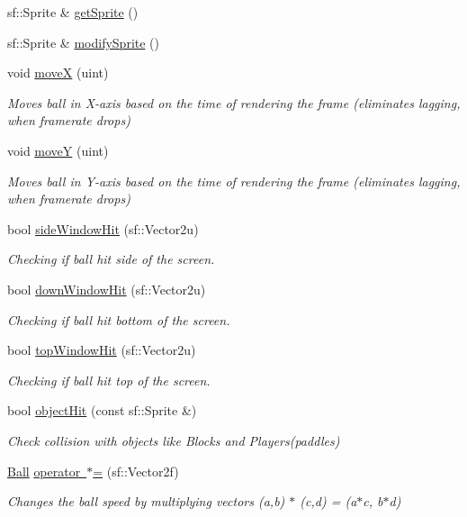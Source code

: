 \begin{DoxyCompactItemize}
sf\+::\+Sprite \& \mbox{\hyperlink{class_ball_a2f85e93bd6650f5c5cbf4a0dbd961ca4}{get\+Sprite}} ()
\item 
sf\+::\+Sprite \& \mbox{\hyperlink{class_ball_a06adff7ba12d0971bb9885cf3fbd2950}{modify\+Sprite}} ()
\item 
void \mbox{\hyperlink{class_ball_ab2a08ec563b02d1dcb0b38dcd5429967}{moveX}} (uint)
\begin{DoxyCompactList}\small\item\em Moves ball in X-\/axis based on the time of rendering the frame (eliminates lagging, when framerate drops) \end{DoxyCompactList}\item 
void \mbox{\hyperlink{class_ball_a5c833ba1588d41ea4176b6fcffff850e}{moveY}} (uint)
\begin{DoxyCompactList}\small\item\em Moves ball in Y-\/axis based on the time of rendering the frame (eliminates lagging, when framerate drops) \end{DoxyCompactList}\item 
bool \mbox{\hyperlink{class_ball_add304c78bcbb5067844d71cb16fc29be}{side\+Window\+Hit}} (sf\+::\+Vector2u)
\begin{DoxyCompactList}\small\item\em Checking if ball hit side of the screen. \end{DoxyCompactList}\item 
bool \mbox{\hyperlink{class_ball_aa1bfb33edb1bdbe67380fe2be419ab11}{down\+Window\+Hit}} (sf\+::\+Vector2u)
\begin{DoxyCompactList}\small\item\em Checking if ball hit bottom of the screen. \end{DoxyCompactList}\item 
bool \mbox{\hyperlink{class_ball_a5e57d9e1b688dc45f6111d7f52b89ccf}{top\+Window\+Hit}} (sf\+::\+Vector2u)
\begin{DoxyCompactList}\small\item\em Checking if ball hit top of the screen. \end{DoxyCompactList}\item 
bool \mbox{\hyperlink{class_ball_a57806d70f8a4f78ba7e66d425465e1e4}{object\+Hit}} (const sf\+::\+Sprite \&)
\begin{DoxyCompactList}\small\item\em Check collision with objects like Blocks and Players(paddles) \end{DoxyCompactList}\item 
\mbox{\hyperlink{class_ball}{Ball}} \mbox{\hyperlink{class_ball_a41fb0c62d108caa6e20573598030c648}{operator $\ast$=}} (sf\+::\+Vector2f)
\begin{DoxyCompactList}\small\item\em Changes the ball speed by multiplying vectors (a,b) $\ast$ (c,d) = (a$\ast$c, b$\ast$d) \end{DoxyCompactList}\end{DoxyCompactItemize}
